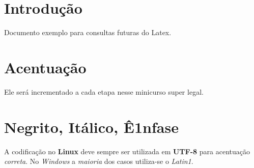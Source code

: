 \documentclass{article}
\begin{document}
	\section{Introdução}
		Documento exemplo para consultas futuras do Latex.

	\section{Acentuação}		
		Ele será incrementado a cada etapa nesse minicurso super legal.
	
	\section{Negrito, Itálico, Ê1nfase}
		A codificação no \textbf{Linux} deve \huge sempre \normalsize ser utilizada em \textbf{UTF-8} para acentuação \emph{correta}. No \textit{Windows} a \emph{maioria} dos casos utiliza-se o \textit{Latin1}.
\end{document}
